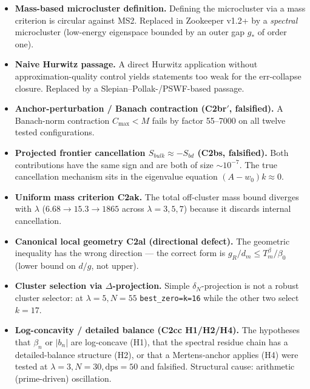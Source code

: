 \documentclass[12pt,a4paper]{article}
\theoremstyle{definition}
\theoremstyle{remark}
\begin{document}
\begin{itemize}
  \item \textbf{Mass-based microcluster definition.} Defining the
    microcluster via a mass criterion is circular against MS2. Replaced
    in Zookeeper v1.2+ by a \emph{spectral} microcluster (low-energy
    eigenspace bounded by an outer gap $g_*$ of order one).

  \item \textbf{Naive Hurwitz passage.} A direct Hurwitz application
    without approximation-quality control yields statements too weak for
    the err-collapse closure. Replaced by a Slepian--Pollak-/PSWF-based
    passage.

  \item \textbf{Anchor-perturbation / Banach contraction (C2br$'$,
    falsified).} A Banach-norm contraction $C_{\max}<M$ fails by factor
    55--7000 on all twelve tested configurations.

  \item \textbf{Projected frontier cancellation $S_{bulk}\approx
    -S_{bd}$ (C2bs, falsified).} Both contributions have the same sign
    and are both of size $\sim 10^{-7}$. The true cancellation mechanism
    sits in the eigenvalue equation $(A-w_0)k\approx 0$.

  \item \textbf{Uniform mass criterion C2ak.} The total off-cluster mass
    bound diverges with $\lambda$ ($6.68\to 15.3\to 1865$ across
    $\lambda=3,5,7$) because it discards internal cancellation.

  \item \textbf{Canonical local geometry C2al (directional defect).}
    The geometric inequality has the wrong direction --- the correct form
    is $g_R/d_m\le T_m^\beta/\beta_0$ (lower bound on $d/g$, not upper).

  \item \textbf{Cluster selection via $\Delta$-projection.} Simple
    $\delta_N$-projection is not a robust cluster selector: at
    $\lambda=5,N=55$ \texttt{best\_zero=k=16} while the other two
    select $k=17$.

  \item \textbf{Log-concavity / detailed balance (C2cc H1/H2/H4).}
    The hypotheses that $\beta_n$ or $|b_n|$ are log-concave (H1), that
    the spectral residue chain has a detailed-balance structure (H2), or
    that a Mertens-anchor applies (H4) were tested at
    $\lambda=3,N=30,\mathrm{dps}=50$ and falsified. Structural cause:
    arithmetic (prime-driven) oscillation.


\end{itemize}
\end{document}
